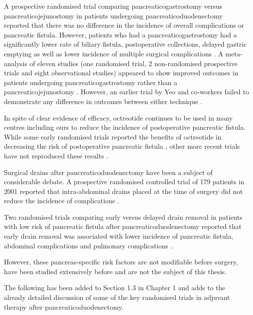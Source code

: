 	A prospective randomised trial comparing pancreaticogastrostomy versus pancreaticojejunostomy in patients undergoing pancreaticoduodenectomy reported that there was no difference in the incidence of overall complications or pancreatic fistula. 
	However, patients who had a pancreaticogastrostomy had a significantly lower rate of biliary fistula, postoperative collections, delayed gastric emptying as well as lower incidence of multiple surgical complications \parencite{bassi_reconstruction_2005}. 
	A meta-analysis of eleven studies (one randomised trial, 2 non-randomised prospective trials and eight observational studies) appeared to show improved outcomes in patients undergoing pancreaticogastrostomy rather than a pancreaticojejunostomy \parencite{mckay_meta-analysis_2006}. 
	However, an earlier trial by Yeo and co-workers failed to demonstrate any difference in outcomes between either technique \parencite{yeo_prospective_1995}.
	
	In spite of clear evidence of efficacy, octreotide continues to be used in many centres including ours to reduce the incidence of postoperative pancreatic fistula. 
	While some early randomised trials reported the benefits of octreotide in decreasing the risk of postoperative pancreatic fistula \parencite{montorsi_efficacy_1995,nakatsuka_octreotide_2000}, other more recent trials have not reproduced these results \parencite{lowy_prospective_1997, yeo_does_2000, kollmar_prophylactic_2008}. 
	
	Surgical drains after pancreaticoduodenectomy have been a subject of considerable debate. 
	A prospective randomised controlled trial of 179 patients in 2001 reported that intra-abdominal drains placed at the time of surgery did not reduce the incidence of complications \parencite{conlon_prospective_2001}.
	
	Two randomised trials comparing early versus delayed drain removal in patients with low risk of pancreatic fistula after pancreaticoduodenectomy reported that early drain removal was associated with lower incidence of pancreatic fistula, abdominal complications and pulmonary complications \parencite{kawai_early_2006,bassi_early_2010}. 
	
	However, these pancreas-specific risk factors are not modifiable before surgery, have been studied extensively before and are not the subject of this thesis.
	
	
	The following has been added to Section 1.3 in Chapter 1 and adds to the already detailed discussion of some of the key randomised trials in adjuvant therapy after pancreaticoduodenectomy.
	
